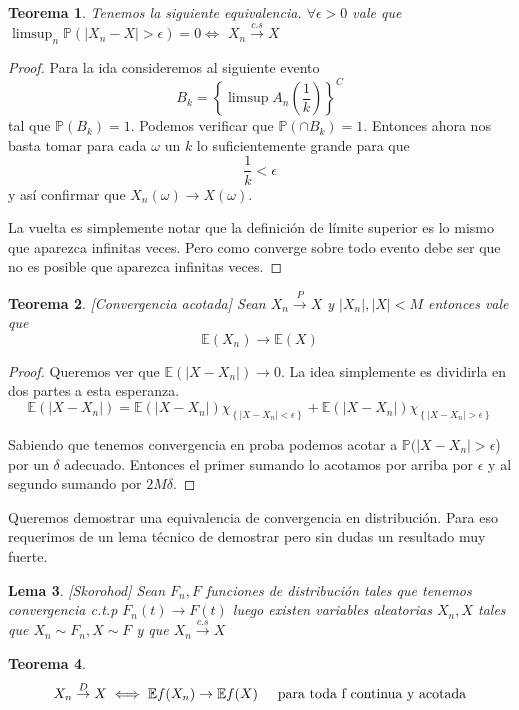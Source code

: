 \documentclass[11pt]{article}
\theoremstyle{plain} %
\newtheorem{teorema}{\color{rojo}Teorema}
\newtheorem{lema}[teorema]{\color{rojo} Lema}
\theoremstyle{definition}
\theoremstyle{remark}
\def\E{\mathbb{E}}
\def\P{\mathbb{P}}
\def\vas{variables aleatorias }
\newcommand{\cs}{\overset{c.s}{\to}}
\newcommand{\proba}{\overset{P}{\to}}
\newcommand{\dist}{\overset{D}{\to}}
\begin{document}
\begin{teorema}
	\label{teo:seriecs}	Tenemos la siguiente equivalencia.
		  $\forall \epsilon > 0$ vale que $\limsup_n \P(|X_n - X|>\epsilon) = 0 \iff$
		 $X_n \cs X$
\end{teorema}

\begin{proof}
	 Para la ida consideremos al siguiente evento
	 \[
	 B_k = \left\lbrace  \limsup A_n(\dfrac{1}{k}) \right\rbrace ^ C
	 \]
	 tal que $\P(B_k)=1$. Podemos verificar que $\P(\cap B_k)=1$. Entonces ahora nos basta tomar para cada $\omega$ un $k$ lo suficientemente grande para que $$\dfrac{1}{k}<\epsilon$$ y así confirmar que $X_n(\omega) \to X(\omega).$
	 
	 La vuelta es simplemente notar que la definición de límite superior es lo mismo que aparezca infinitas veces. Pero como converge sobre todo evento debe ser que no es posible que aparezca infinitas veces. 
	 
	 
\end{proof}

\begin{teorema}
	\label{teo:convacot}
	[Convergencia acotada]
	Sean $X_n \proba X$ y $|X_n|,|X| < M$ entonces vale que
	\[ \E(X_n) \to \E(X) \]
\end{teorema}

\begin{proof}	
	Queremos ver que $\E(|X-X_n|) \to 0$. La idea simplemente es dividirla en dos partes a esta esperanza. 
	\[\E(|X-X_n|) = \E(|X-X_n|)\chi_{\left\lbrace |X-X_n|<\epsilon\right\rbrace } + \E(|X-X_n|)\chi_{\left\lbrace |X-X_n|>\epsilon\right\rbrace }\]
	
	Sabiendo que tenemos convergencia en proba podemos acotar a $\P(|X-X_n|>\epsilon$) por un $\delta$ adecuado. Entonces el primer sumando lo acotamos por arriba por $\epsilon$ y al segundo sumando por  $2M\delta$.  
\end{proof}

Queremos demostrar una equivalencia de convergencia en distribución. Para eso requerimos de un lema técnico de demostrar pero sin dudas un resultado muy fuerte.

\begin{lema}
	\label{teo:sko}
	[Skorohod]
	Sean $F_n, F$ funciones de distribución tales que tenemos convergencia c.t.p $F_n(t) \to F(t)$
	luego existen \vas $X_n, X$ tales que $X_n \sim F_n, X \sim F$ y que $X_n \cs X$
\end{lema}

 
\begin{teorema}
	\label{teo:convdist}
	\[ X_n \dist X \iff \E f(X_n) \to \E f(X) \hskip0.5cm \text{para toda f continua y acotada}  \]
\end{teorema}
\end{document}
